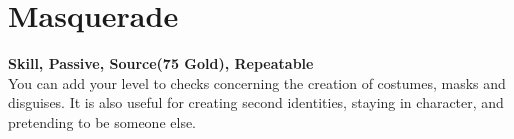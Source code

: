 \section{Masquerade}\label{sec:masquerade}
\textbf{Skill, Passive, Source(75 Gold), Repeatable}\\
You can add your level to checks concerning the creation of costumes, masks and disguises. It is also useful for creating second identities, staying in character, and pretending to be someone else.
